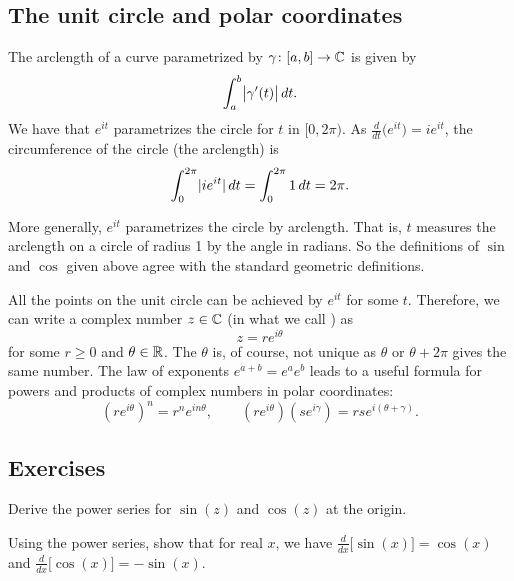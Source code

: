 \subsection{The unit circle and polar coordinates}

The arclength of a curve parametrized by $\gamma \colon [a,b] \to {\mathbb{C}}$ is given
by
\begin{equation*}
\int_a^b \bigl\lvert {\gamma'(t)} \bigr\rvert \, dt .
\end{equation*}
We have that $e^{it}$ parametrizes the circle for $t$ in $[0,2\pi)$.
As $\frac{d}{dt} \bigl( e^{it} \bigr) = ie^{it}$, the circumference of the
circle (the arclength) is
\begin{equation*}
\int_0^{2\pi} \lvert {i e^{it}} \rvert  \,  dt
=
\int_0^{2\pi} 1  \,  dt  = 2\pi .
\end{equation*}

More generally, $e^{it}$ parametrizes the circle by arclength.
That is, $t$ measures the arclength on a circle of radius 1 by
the angle in radians.  So the definitions of $\sin$ and $\cos$ given
above agree with the standard geometric definitions.

All the points on the unit circle can be achieved by
$e^{it}$ for some $t$.
Therefore,
we can write
a complex number $z \in {\mathbb{C}}$
(in what we call \emph{}) as
\begin{equation*}
z = r e^{i\theta}
\end{equation*}
for some $r \geq 0$ and $\theta \in {\mathbb{R}}$.  The $\theta$ is, of course,
not unique as $\theta$ or $\theta+2\pi$ gives the same number.
The law of exponents $e^{a+b} = e^a e^b$ leads to a useful formula for powers
and products of complex numbers in polar coordinates:
\begin{equation*}
{(r e^{i\theta})}^n
= r^n e^{i n \theta} ,
\qquad
(r e^{i\theta})
(s e^{i\gamma})
=
rs e^{i(\theta+\gamma)} .
\end{equation*}

\subsection{Exercises}

\begin{exercise}
Derive the power series for $\sin(z)$ and $\cos(z)$ at the origin.
\end{exercise}

\begin{exercise}
Using the power series, show that for real $x$, we have
$\frac{d}{dx} \bigl[ \sin(x)\bigr] = \cos(x)$ and
$\frac{d}{dx} \bigl[ \cos(x)\bigr] = -\sin(x)$.
\end{exercise}

